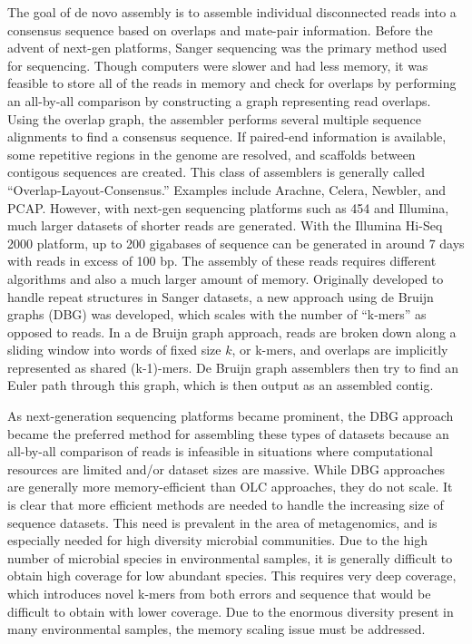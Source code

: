 \documentclass[12pt]{article} \usepackage{simplemargins}
\begin{document}
The goal of de novo assembly is to assemble individual disconnected
reads into a consensus sequence based on overlaps and mate-pair
information. Before the advent of next-gen platforms, Sanger
sequencing was the primary method used for sequencing.  Though
computers were slower and had less memory, it was feasible to
store all of the reads in memory and check for overlaps by performing
an all-by-all comparison by constructing a graph 
representing read overlaps\cite{assemblyreview}.
Using the 
overlap graph, the assembler 
performs several multiple sequence alignments to find a consensus sequence. 
If paired-end information is available, some repetitive regions in the 
genome are resolved, and scaffolds between contigous sequences are 
created. This class of assemblers is generally called 
``Overlap-Layout-Consensus.'' Examples include
Arachne\cite{arachne}, Celera\cite{celera}, Newbler\cite{newbler}, and 
PCAP\cite{pcap}. However, with next-gen sequencing 
platforms such as 454 and Illumina, much larger datasets of shorter reads 
are generated. With the Illumina Hi-Seq 2000 platform, up to 200 
gigabases of sequence can be generated 
in around 7 days with reads in excess of 100 bp. The assembly of 
these reads requires different
algorithms and also a much larger amount of memory. Originally developed to 
handle repeat structures in Sanger datasets, a new approach using de Bruijn 
graphs (DBG) was developed\cite{pmid11504945}, which scales with the number 
of ``k-mers'' as opposed to reads.
In a de Bruijn
graph approach, reads are broken down along a sliding window into words of fixed
size $k$, or k-mers, and overlaps are implicitly represented as shared (k-1)-mers.
De Bruijn graph assemblers then try to find an Euler path through
this graph, which is then output as an assembled contig\cite{assemblyreview}.

As next-generation sequencing platforms became prominent, the DBG approach
became the preferred method for assembling these types of datasets
because an all-by-all comparison of reads is infeasible in situations where 
computational resources are limited and/or dataset sizes are massive. While DBG
approaches are generally more memory-efficient than OLC approaches,
they do not scale.  It
is clear that more efficient methods are needed to handle the
increasing size of sequence datasets. This need is
prevalent in the area of metagenomics, and is especially
needed for high diversity
microbial communities. Due to the high number of microbial species 
in environmental samples, it is generally difficult to obtain high coverage 
for low abundant species. This 
requires very deep coverage, which introduces novel k-mers from both 
errors and sequence that 
would be difficult to obtain with lower coverage. Due to the enormous 
diversity present in many
environmental samples, the memory scaling issue must be addressed.
\end{document}

